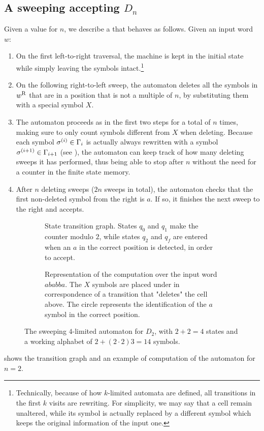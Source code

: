 \subsection{A sweeping \texorpdfstring{\kDLA}{k-DLA} accepting \texorpdfstring{$D_n$}{Ln}}
Given a value for $n$, we describe a  that behaves as follows. Given an input word $w$:
\begin{enumerate}
	\item On the first left-to-right traversal, the machine is kept in the initial state while simply leaving the symbols intact.\footnote{%
		      Technically, because of how $k$-limited automata are defined, all transitions in the first $k$ visits are rewriting. For simplicity, we may say that a cell remain unaltered, while its symbol is actually replaced by a different symbol which keeps the original information of the input one.}
	\item On the following right-to-left sweep, the automaton deletes all the symbols in $w^{\mathrm R}$ that are in a position that is not a multiple of $n$, by substituting them with a special symbol $X$.
	\item The automaton proceeds as in the first two steps for a total of $n$ times, making sure to only count symbols different from $X$ when deleting.
	      Because each symbol $\sigma^{(i)}\in\Gamma_i$ is actually always rewritten with a symbol $\sigma^{(i+1)}\in\Gamma_{i+1}$ (see ), the automaton can keep track of how many deleting sweeps it has performed, thus being able to stop after $n$ without the need for a counter in the finite state memory.
	\item After $n$ deleting sweeps ($2n$ sweeps in total), the automaton checks that the first non-deleted symbol from the right is $a$.
	      If so, it finishes the next sweep to the right and accepts.
\end{enumerate}

\begin{figure}
	\centering
	\begin{subfigure}[b]{0.52\textwidth}
		\centering
		
		\caption{State transition graph.
			States $q_0$ and $q_1$ make the counter modulo $2$, while states $q_2$ and $q_f$ are entered when an $a$ in the correct position is detected, in order to accept.}
	\end{subfigure}
	\hfill
	\begin{subfigure}[b]{0.46\textwidth}
		\centering
		
		\caption{Representation of the computation over the input word $ababba$.
			The $X$ symbols are placed under in correspondence of a transition that "deletes" the cell above.
			The circle represents the identification of the $a$ symbol in the correct position.}
	\end{subfigure}

	\caption[The sweeping $4$-limited automaton for $D_2$ witnessing the lower bound for the gap between sweeping \kDLA and \ONFA.]{The sweeping $4$-limited automaton for $D_2$, with $2+2=4$ states and a working alphabet of $2+(2\cdot2)3=14$ symbols.}
	\label{fig:sweepingDn}
\end{figure}
 shows the transition graph and an example of computation of the automaton for $n=2$.

